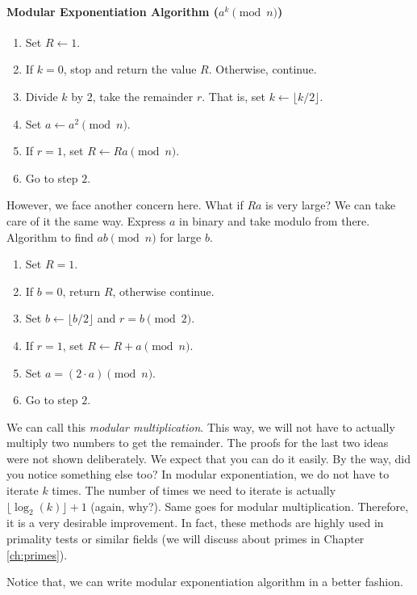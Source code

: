 \documentclass{subfile}
\begin{document}
	\paragraph{Modular Exponentiation Algorithm ($a^k\pmod n$)}
		\begin{enumerate}[1.]
			\item Set $R \longleftarrow 1$.
			\item If $k=0$, stop and return the value $R$. Otherwise, continue.\label{alg:stopme}
			\item Divide $k$ by $2$, take the remainder $r$. That is, set $k\longleftarrow \lfloor k/2\rfloor$.
			\item Set $a\longleftarrow a^2\pmod n$.
			\item If $r=1$, set $R\longleftarrow Ra\pmod n$.
			\item Go to step $2$.
		\end{enumerate}
	However, we face another concern here. What if $Ra$ is very large? We can take care of it the same way. Express $a$ in binary and take modulo from there. Algorithm to find $ab\pmod n$ for large $b$.
		\begin{enumerate}[1.]
			\item Set $R=1$.
			\item If $b=0$, return $R$, otherwise continue.
			\item Set $b\longleftarrow \lfloor b/2\rfloor$ and $r=b\pmod2$.
			\item If $r=1$, set $R\longleftarrow R+a\pmod n$.
			\item Set $a = (2\cdot a)\pmod n$.
			\item Go to step $2$.
		\end{enumerate}
	We can call this \textit{modular multiplication}. This way, we will not have to actually multiply two numbers to get the remainder. The proofs for the last two ideas were not shown deliberately. We expect that you can do it easily. By the way, did you notice something else too? In modular exponentiation, we do not have to iterate $k$ times. The number of times we need to iterate is actually $\lfloor \log_2(k)\rfloor+1$ (again, why?). Same goes for modular multiplication. Therefore, it is a very desirable improvement. In fact, these methods are highly used in primality tests or similar fields (we will discuss about primes in Chapter \ref{ch:primes}).

	Notice that, we can write modular exponentiation algorithm in a better fashion.
\end{document}
